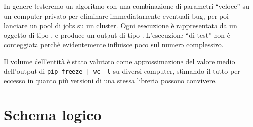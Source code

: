 \documentclass{article}
\begin{document}
In genere testeremo un algoritmo con una combinazione di parametri ``veloce'' su un computer privato per eliminare immediatamente eventuali bug, per poi lanciare un pool di jobs su un cluster. Ogni esecuzione è rappresentata da un oggetto di tipo , e produce un output di tipo . L'esecuzione ``di test'' non è conteggiata perchè evidentemente influisce poco sul numero complessivo.

Il volume dell'entità  è stato valutato come approssimazione del valore medio dell'output di \texttt{pip freeze | wc -l} su diversi computer, stimando il tutto per eccesso in quanto più versioni di una stessa libreria possono convivere.

\section{Schema logico}
\begin{table}[H]
\end{table}
\end{document}
